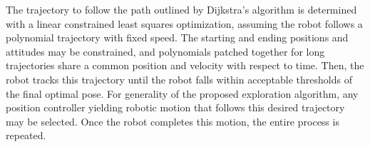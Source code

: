 \documentclass[smallextended]{svjour3}       %
\begin{document}
The trajectory to follow the path outlined by Dijkstra's algorithm is determined with a linear constrained least squares optimization, assuming the robot follows a polynomial trajectory with fixed speed. The starting and ending positions and attitudes may be constrained, and polynomials patched together for long trajectories share a common position and velocity with respect to time. Then, the robot tracks this trajectory until the robot falls within acceptable thresholds of the final optimal pose. For generality of the proposed exploration algorithm, any position controller yielding robotic motion that follows this desired trajectory may be selected. Once the robot completes this motion, the entire process is repeated.


\end{document}
